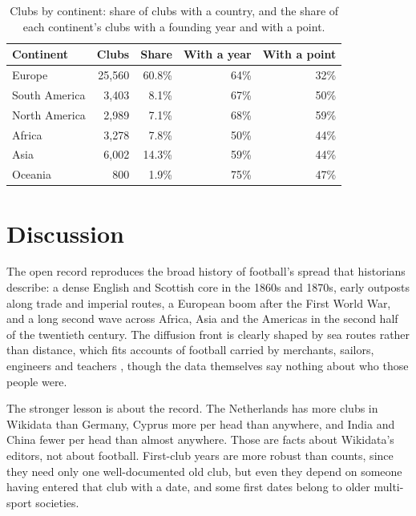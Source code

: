 \documentclass[11pt,a4paper]{article}
\begin{document}
\begin{table}[tbp]\centering\small\caption{Clubs by continent: share of clubs with a country, and the share of each continent's clubs with a founding year and with a point.}\label{tab:cov}\begin{tabular}{lrrrr}\toprule Continent & Clubs & Share & With a year & With a point\\\midrule
Europe & 25,560 & 60.8\% & 64\% & 32\%\\
South America & 3,403 & 8.1\% & 67\% & 50\%\\
North America & 2,989 & 7.1\% & 68\% & 59\%\\
Africa & 3,278 & 7.8\% & 50\% & 44\%\\
Asia & 6,002 & 14.3\% & 59\% & 44\%\\
Oceania & 800 & 1.9\% & 75\% & 47\%\\
\bottomrule\end{tabular}\end{table}

\section{Discussion}
The open record reproduces the broad history of football's spread that historians describe: a dense English and Scottish core in the 1860s and 1870s, early outposts along trade and imperial routes, a European boom after the First World War, and a long second wave across Africa, Asia and the Americas in the second half of the twentieth century. The diffusion front is clearly shaped by sea routes rather than distance, which fits accounts of football carried by merchants, sailors, engineers and teachers \citep{goldblatt}, though the data themselves say nothing about who those people were.

The stronger lesson is about the record. The Netherlands has more clubs in Wikidata than Germany, Cyprus more per head than anywhere, and India and China fewer per head than almost anywhere. Those are facts about Wikidata's editors, not about football. First-club years are more robust than counts, since they need only one well-documented old club, but even they depend on someone having entered that club with a date, and some first dates belong to older multi-sport societies.
\end{document}
